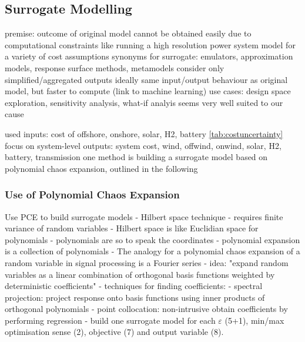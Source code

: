 \subsection{Surrogate Modelling}
\label{sec:surrogate}


premise: outcome of original model cannot be obtained easily due to computational constraints
like running a high resolution power system model for a variety of cost assumptions
synonyms for surrogate: emulators, approximation models, response surface methods, metamodels
consider only simplified/aggregated outputs
ideally same input/output behaviour as original model, but faster to compute (link to machine learning) \cite{palar_multi-fidelity_2016}
use cases: design space exploration, sensitivity analysis, what-if analyis
seems very well suited to our cause


used inputs: cost of offshore, onshore, solar, H2, battery \cref{tab:costuncertainty}
focus on system-level outputs: system cost, wind, offwind, onwind, solar, H2, battery, transmission
one method is building a surrogate model based on polynomial chaos expansion, outlined in the following

\subsubsection{Use of Polynomial Chaos Expansion}
\label{sec:pce}


Use PCE to build surrogate models \cite{sudret_global_2008,marelli_uqlab_nodate,fajraoui_optimal_2017,gratiet_metamodel-based_2015}
- Hilbert space technique
- requires finite variance of random variables
- Hilbert space is like Euclidian space for polynomials
- polynomials are so to speak the coordinates \cite{gratiet_metamodel-based_2015}
- polynomial expansion is a collection of polynomials
- The analogy for a polynomial chaos expansion of a random variable in signal processing is a Fourier series \cite{muhlpfordt_uncertainty_2020}
- idea: "expand random variables as a linear combination of orthogonal basis functions weighted by deterministic coefficients" \cite{muhlpfordt_uncertainty_2020}
- techniques for finding coefficients:
  - spectral projection: project response onto basis functions using inner products of orthogonal polynomials \cite{palar_multi-fidelity_2016}
  - point collocation: non-intrusive obtain coefficients by performing regression \cite{ng_multifidelity_2012,palar_multi-fidelity_2016,fajraoui_optimal_2017}
  - build one surrogate model for each $\varepsilon$ (5+1), min/max optimisation sense (2), objective (7) and output variable (8).

